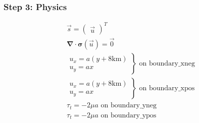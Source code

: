 \documentclass[aspectratio=169]{beamer}
\begin{document}
\begin{frame}[t]
  \frametitle{Step 3: Physics}
  \summary{}

  \begin{minipage}{0.35\textwidth}
    {\scriptsize
    \begin{gather*}
      \vec{s} = \left(\begin{array}{c} \vec{u} \end{array}\right)^T \\
      \boldsymbol{\nabla} \cdot \boldsymbol{\sigma}(\vec{u}) = \vec{0} \\
      \left. \begin{array}{c} u_x = a(y+8\mathrm{km}) \\ u_y = ax \end{array}\right\} \text{ on boundary\_xneg} \\
      \left. \begin{array}{c} u_x = a(y+8\mathrm{km}) \\ u_y = ax \end{array}\right\} \text{ on boundary\_xpos} \\
      \tau_t = -2\mu a \text{ on boundary\_yneg} \\
      \tau_t = -2\mu a \text{ on boundary\_ypos}
    \end{gather*}}
  \end{minipage}
  \hfill
  \begin{minipage}{0.55\textwidth}
  \end{minipage}
      
\end{frame}
\end{document}
